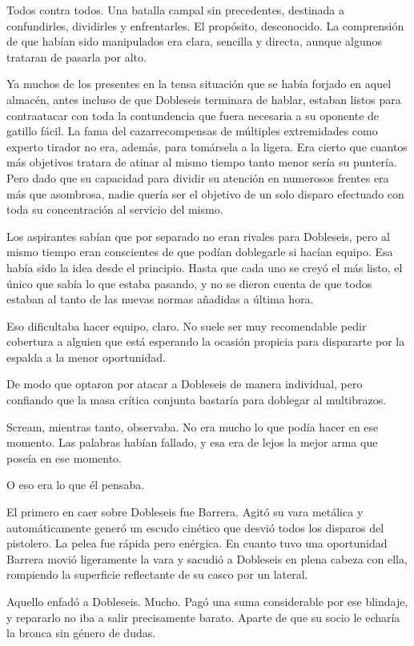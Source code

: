 Todos contra todos. Una batalla campal sin precedentes, destinada a confundirles, dividirles y enfrentarles. El propósito, desconocido. La comprensión de que habían sido manipulados era clara, sencilla y directa, aunque algunos trataran de pasarla por alto.
 
\fancyparbreak
Ya muchos de los presentes en la tensa situación que se había forjado en aquel almacén, antes incluso de que Dobleseis terminara de hablar, estaban listos para contraatacar con toda la contundencia que fuera necesaria a su oponente de gatillo fácil. La fama del cazarrecompensas de múltiples extremidades como experto tirador no era, además, para tomársela a la ligera. Era cierto que cuantos más objetivos tratara de atinar al mismo tiempo tanto menor sería su puntería. Pero dado que su capacidad para dividir su atención en numerosos frentes era más que asombrosa, nadie quería ser el objetivo de un solo disparo efectuado con toda su concentración al servicio del mismo.

Los aspirantes sabían que por separado no eran rivales para Dobleseis, pero al mismo tiempo eran conscientes de que podían doblegarle si hacían equipo. Esa había sido la idea desde el principio. Hasta que cada uno se creyó el más listo, el único que sabía lo que estaba pasando, y no se dieron cuenta de que todos estaban al tanto de las nuevas normas añadidas a última hora.

Eso dificultaba hacer equipo, claro. No suele ser muy recomendable pedir cobertura a alguien que está esperando la ocasión propicia para dispararte por la espalda a la menor oportunidad.

De modo que optaron por atacar a Dobleseis de manera individual, pero confiando que la masa crítica conjunta bastaría para doblegar al multibrazos.

Scream, mientras tanto, observaba. No era mucho lo que podía hacer en ese momento. Las palabras habían fallado, y esa era de lejos la mejor arma que poseía en ese momento.

O eso era lo que él pensaba.

El primero en caer sobre Dobleseis fue Barrera. Agitó su vara metálica y automáticamente generó un escudo cinético que desvió todos los disparos del pistolero. La pelea fue rápida pero enérgica. En cuanto tuvo una oportunidad Barrera movió ligeramente la vara y sacudió a Dobleseis en plena cabeza con ella, rompiendo la superficie reflectante de su casco por un lateral.

Aquello enfadó a Dobleseis. Mucho. Pagó una suma considerable por ese blindaje, y repararlo no iba a salir precisamente barato. Aparte de que su socio le echaría la bronca sin género de dudas.


